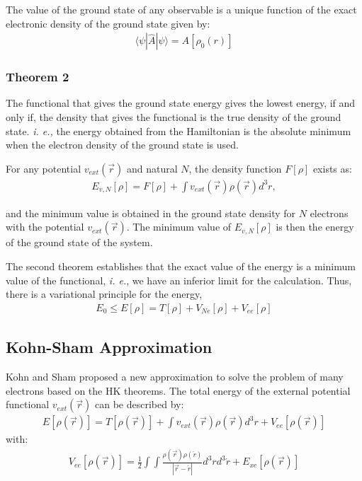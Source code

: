 \pagebreak

The value of the ground state of any observable is a unique function of the
exact electronic density of the ground state given by:
\begin{align}
  \langle \psi |\widehat{A}|\psi \rangle = A[\rho_0 (r)]
\end{align}

\subsubsection{Theorem 2}

The functional that gives the ground state energy gives the lowest energy, if
and only if, the density that gives the functional is the true density of the
ground state. \textit{i. e.,} the energy obtained from the Hamiltonian is the
absolute minimum when the electron density of the ground state is used.

For any potential $v_{ext}(\vec{r})$ and natural $N$, the density function
$F[\rho]$ exists as:
%
\begin{align}
  E_{v, N} [\rho] = F[\rho] + \int v_{ext}(\vec{r})\rho(\vec{r}) d^{3}r ,
\end{align}

\noindent and the minimum value is obtained in the ground state density for $N$
electrons with the potential $v_{ext}(\vec{r})$. The minimum value of $E_{v, N}
[\rho]$ is then the energy of the ground state of the system.

The second theorem establishes that the exact value of the energy is a minimum
value of the functional, \textit{i. e.}, we have an inferior limit for the
calculation.  Thus, there is a variational principle for the energy,
%
\begin{align}
  E_{0}\leq E[\rho]=T[\rho] + V_{Ne}[\rho]+V_{ee}[\rho]
\end{align}

\subsection{Kohn-Sham Approximation}\label{KSapprox}

Kohn and Sham proposed a new approximation to solve the problem of many
electrons based on the HK theorems. The total energy of the external potential
functional $v_{ext}(\vec{r})$ can be described by:
\begin{align}
  E[\rho(\vec{r})] = T[\rho(\vec{r})] + \int v_{ext}(\vec{r})\rho(\vec{r})d^{3}r +
  V_{ee}[\rho(\vec{r})] 
  \label{KS1}
\end{align}
\noindent with:
\begin{align}
  V_{ee}[\rho(\vec{r})] = \frac12 \int\int \frac{\rho(\vec{r})\rho(\acute{r})}{|\vec{r}-\acute{r}|}d^{3}r
  d^{3}\acute{r} + {E}_{xc}[\rho(\vec{r})] 
\end{align}


